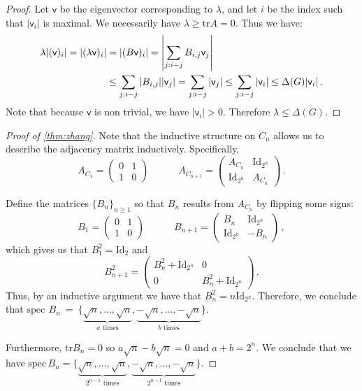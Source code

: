 \documentclass[12pt]{amsart}
\theoremstyle{definition}
\newcommand{\vv}{\mathsf{v}}
\newcommand{\tr}{\mathrm{tr}}
\newcommand{\Id}{\mathrm{Id}}
\newcommand{\spec}{\mathrm{spec} }
\begin{document}
\begin{proof}
Let $\vv $ be the eigenvector corresponding to $\lambda$, and let $i$ be the index such that $|\vv_i |$ is maximal.
We necessarily have $\lambda \geq \tr A = 0$.
Thus we have:
\begin{align*}
\lambda  |(\vv)_i| = |(\lambda \vv)_i| &= | (B\vv)_i | = \left| \sum_{j: i\-- j} B_{i, j} \vv_j  \right| \\
&\leq \sum_{j: i\-- j} |B_{i, j}| |\vv_j| = \sum_{j : i\-- j} |\vv_j| \leq  \sum_{j : i\-- j} |\vv_i| \leq \Delta(G) |\vv_i|\, . 
\end{align*}
Note that because $\vv$ is non trivial, we have $|\vv_i|  > 0$.
Therefore $\lambda \leq \Delta(G)$.
\end{proof}

\begin{proof}[Proof of \cref{thm:zhang}]

Note that the inductive structure on $C_n$ allows us to describe the adjacency matrix inductively.
Specifically,
$$ A_{C_1} = \begin{pmatrix}
0 & 1 \\
1 & 0
\end{pmatrix} \quad \quad \quad 
A_{C_{n+1}} = \begin{pmatrix}
A_{C_n} & \Id_{2^n} \\
\Id_{2^n} & A_{C_n}
\end{pmatrix}\, . $$

Define the matrices $\{B_n\}_{n\geq 1}$ so that $B_n$ results from $A_{C_n}$ by flipping some signs:
$$ B_1 = \begin{pmatrix}
0 & 1 \\
1 & 0
\end{pmatrix} \quad \quad \quad 
B_{n+1} = \begin{pmatrix}
B_n & \Id_{2^n} \\
\Id_{2^n} & -B_n
\end{pmatrix}\, ,$$
which gives us that $B_1^2 = \Id_{2}$ and 
$$
B_{n+1}^2 = \begin{pmatrix}
B_n^2 + \Id_{2^n} & 0 \\
0 & B_n^2 + \Id_{2^n}
\end{pmatrix}\, . $$
Thus, by an inductive argument we have that $B_n^2 = n\Id_{2^n}$.
Therefore, we conclude that $\spec\,~B_n~=~\{ \underbrace{\sqrt{n}, \ldots, \sqrt{n}}_{a \text{ times}}, \underbrace{-\sqrt{n}, \ldots, -\sqrt{n}}_{b \text{ times}} \}$. 

Furthermore, $\tr B_n = 0 $ so $a\sqrt{n} - b\sqrt{n} = 0$ and $a+b = 2^n$.
We conclude that we have $\spec \, B_n = \{ \underbrace{\sqrt{n}, \ldots, \sqrt{n}}_{2^{n-1} \text{ times}}, \underbrace{-\sqrt{n}, \ldots, -\sqrt{n}}_{2^{n-1} \text{ times}} \}$. 


\end{proof}
\end{document}
